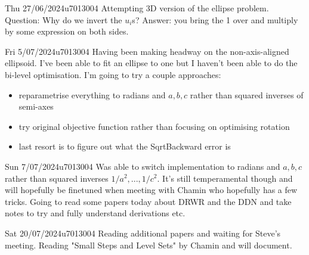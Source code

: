 \documentclass{project-logbook}
\begin{document}
	\begin{MeetingMinutes}{Thu 27/06/2024}{u7013004}
		Attempting 3D version of the ellipse problem. \\
		Question: Why do we invert the $u_i$s? Answer: you bring the 1 over and multiply by some expression on both sides.
	\end{MeetingMinutes}
	
	\begin{MeetingMinutes}{Fri 5/07/2024}{u7013004}
		Having been making headway on the non-axis-aligned ellipsoid.
		I've been able to fit an ellipse to one but I haven't been able to do the bi-level optimisation.
		I'm going to try a couple approaches:
		\begin{itemize}
			\item reparametrise everything to radians and $a,b,c$ rather than squared inverses of semi-axes 
			\item try original objective function rather than focusing on optimising rotation 
			\item last resort is to figure out what the SqrtBackward error is
		\end{itemize}
	\end{MeetingMinutes}
	
	\begin{MeetingMinutes}{Sun 7/07/2024}{u7013004}
		Was able to switch implementation to radians and $a,b,c$ rather than squared inverses $1/a^2,...,1/c^2$. 
		It's still temperamental though and will hopefully be finetuned when meeting with Chamin who hopefully has a few tricks.
		Going to read some papers today about DRWR and the DDN and take notes to try and fully understand derivations etc.
	\end{MeetingMinutes}
	
	\begin{MeetingMinutes}{Sat 20/07/2024}{u7013004}
		Reading additional papers and waiting for Steve's meeting. Reading "Small Steps and Level Sets" by Chamin and will document.
	\end{MeetingMinutes}
\end{document}
